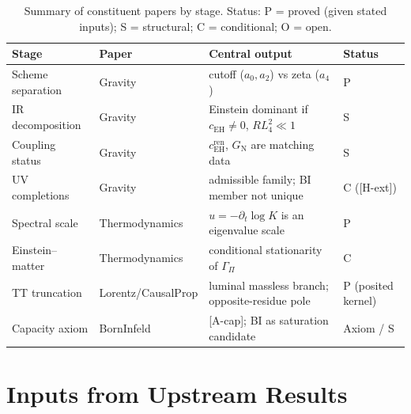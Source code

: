 \documentclass[11pt,a4paper]{article}
\theoremstyle{definition}
\newcommand{\GN}{G_{\mathrm{N}}}
\newcommand{\cEH}{c_{\mathrm{EH}}}
\begin{document}
      \begin{table}[ht]
        \centering
        \caption{Summary of constituent papers by stage.
        Status: P = proved (given stated inputs); S = structural; C = conditional; O = open.}
        \label{tab:papers}
        \renewcommand{\arraystretch}{1.2}
        \begin{tabular}{@{}llll@{}}
          \toprule
          Stage & Paper & Central output & Status \\
          \midrule
          Scheme separation & Gravity & cutoff ($a_0, a_2$) vs zeta ($a_4$) & P \\
          IR decomposition & Gravity & Einstein dominant if $\cEH \neq 0$, $RL_4^2 \ll 1$ & S \\
          Coupling status & Gravity & $\cEH^{\mathrm{ren}}$, $\GN$ are matching data & S \\
          UV completions & Gravity & admissible family; BI member not unique & C ([H-ext]) \\
          Spectral scale & Thermodynamics & $u = -\partial_t\log K$ is an eigenvalue scale & P \\
          Einstein--matter & Thermodynamics & conditional stationarity of $\Gamma_\Pi$ & C \\
          TT truncation & Lorentz/CausalProp & luminal massless branch; opposite-residue pole & P (posited kernel) \\
          Capacity axiom & BornInfeld & [A-cap]; BI as saturation candidate & Axiom / S \\
          \bottomrule
        \end{tabular}
      \end{table}

  \section{Inputs from Upstream Results}
    \label{sec:inputs}
\end{document}
